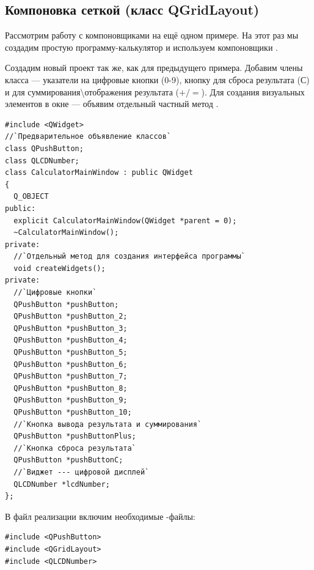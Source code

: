 \subsection[Компоновка сеткой (класс QGridLayout)]{Компоновка сеткой (класс QGridLayout)}

Рассмотрим работу с компоновщиками на ещё одном примере. На этот раз мы создадим простую программу-калькулятор и
используем компоновщики .

Создадим новый проект так же, как для предыдущего примера. Добавим члены класса --- указатели на цифровые кнопки (0-9),
кнопку для сброса результата (С) и для суммирования{\textbackslash}отображения результата ($+/=$). Для создания
визуальных элементов в окне --- объявим отдельный частный метод .
\begin{lstlisting}
#include <QWidget>
//`Предварительное объявление классов`
class QPushButton;
class QLCDNumber;
class CalculatorMainWindow : public QWidget
{
  Q_OBJECT
public:
  explicit CalculatorMainWindow(QWidget *parent = 0);
  ~CalculatorMainWindow();
private:
  //`Отдельный метод для создания интерфейса программы`
  void createWidgets();
private:
  //`Цифровые кнопки`
  QPushButton *pushButton;
  QPushButton *pushButton_2;
  QPushButton *pushButton_3;
  QPushButton *pushButton_4;
  QPushButton *pushButton_5;
  QPushButton *pushButton_6;
  QPushButton *pushButton_7;
  QPushButton *pushButton_8;
  QPushButton *pushButton_9;
  QPushButton *pushButton_10;
  //`Кнопка вывода результата и суммирования`
  QPushButton *pushButtonPlus;
  //`Кнопка сброса результата`
  QPushButton *pushButtonC;
  //`Виджет --- цифровой дисплей`
  QLCDNumber *lcdNumber;
};
\end{lstlisting}


В файл реализации включим необходимые -файлы:
\begin{lstlisting}
#include <QPushButton>
#include <QGridLayout>
#include <QLCDNumber>
\end{lstlisting}

